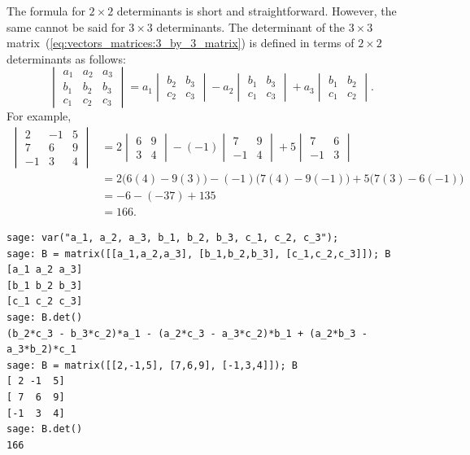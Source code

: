 The formula for $2 \times 2$ determinants is short and
straightforward. However, the same cannot be said for $3 \times 3$
determinants. The determinant of the $3 \times 3$
matrix~(\ref{eq:vectors_matrices:3_by_3_matrix}) is defined in terms
of $2 \times 2$
determinants as follows:
%
\begin{equation}
\label{eq:vectors_matrices:3_by_3_determinant}
\begin{vmatrix}
a_1 & a_2 & a_3 \\
b_1 & b_2 & b_3 \\
c_1 & c_2 & c_3
\end{vmatrix}
=
a_1
\begin{vmatrix}
b_2 & b_3 \\
c_2 & c_3
\end{vmatrix}
-
a_2
\begin{vmatrix}
b_1 & b_3 \\
c_1 & c_3
\end{vmatrix}
+
a_3
\begin{vmatrix}
b_1 & b_2 \\
c_1 & c_2
\end{vmatrix}.
\end{equation}
%
For example,
%
\begin{align*}
\begin{vmatrix}
2  & -1 & 5 \\
7  & 6  & 9 \\
-1 & 3  & 4
\end{vmatrix}
&=
2
\begin{vmatrix}
6 & 9 \\
3 & 4
\end{vmatrix}
-
(-1)
\begin{vmatrix}
7  & 9 \\
-1 & 4
\end{vmatrix}
+
5
\begin{vmatrix}
7  & 6 \\
-1 & 3
\end{vmatrix} \\
&= 2 \big( 6(4) - 9(3) \big)
 - (-1) \big( 7(4) - 9(-1) \big)
 + 5 \big( 7(3) - 6(-1) \big) \\
&=
-6 - (-37) + 135 \\
&=
166.
\end{align*}

\begin{lstlisting}
sage: var("a_1, a_2, a_3, b_1, b_2, b_3, c_1, c_2, c_3");
sage: B = matrix([[a_1,a_2,a_3], [b_1,b_2,b_3], [c_1,c_2,c_3]]); B
[a_1 a_2 a_3]
[b_1 b_2 b_3]
[c_1 c_2 c_3]
sage: B.det()
(b_2*c_3 - b_3*c_2)*a_1 - (a_2*c_3 - a_3*c_2)*b_1 + (a_2*b_3 - a_3*b_2)*c_1
sage: B = matrix([[2,-1,5], [7,6,9], [-1,3,4]]); B
[ 2 -1  5]
[ 7  6  9]
[-1  3  4]
sage: B.det()
166
\end{lstlisting}

